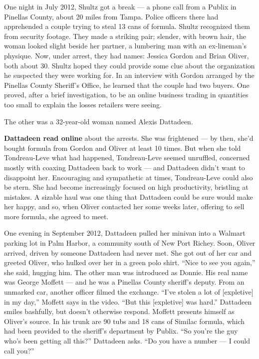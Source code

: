 One night in July 2012, Shultz got a break --- a phone call from a
Publix in Pinellas County, about 20 miles from Tampa. Police officers
there had apprehended a couple trying to steal 13 cans of formula.
Shultz recognized them from security footage. They made a striking pair;
slender, with brown hair, the woman looked slight beside her partner, a
lumbering man with an ex-lineman's physique. Now, under arrest, they had
names: Jessica Gordon and Brian Oliver, both about 30. Shultz hoped they
could provide some clue about the organization he suspected they were
working for. In an interview with Gordon arranged by the Pinellas County
Sheriff's Office, he learned that the couple had two buyers. One proved,
after a brief investigation, to be an online business trading in
quantities too small to explain the losses retailers were seeing.

The other was a 32-year-old woman named Alexis Dattadeen.

\textbf{Dattadeen read online} about the arrests. She was frightened ---
by then, she'd bought formula from Gordon and Oliver at least 10 times.
But when she told Tondreau-Leve what had happened, Tondreau-Leve seemed
unruffled, concerned mostly with coaxing Dattadeen back to work --- and
Dattadeen didn't want to disappoint her. Encouraging and sympathetic at
times, Tondreau-Leve could also be stern. She had become increasingly
focused on high productivity, bristling at mistakes. A sizable haul was
one thing that Dattadeen could be sure would make her happy, and so,
when Oliver contacted her some weeks later, offering to sell more
formula, she agreed to meet.

One evening in September 2012, Dattadeen pulled her minivan into a
Walmart parking lot in Palm Harbor, a community south of New Port
Richey. Soon, Oliver arrived, driven by someone Dattadeen had never met.
She got out of her car and greeted Oliver, who hulked over her in a
green polo shirt. ``Nice to see you again,'' she said, hugging him. The
other man was introduced as Donnie. His real name was George Moffett ---
and he was a Pinellas County sheriff's deputy. From an unmarked car,
another officer filmed the exchange. ``I've stolen a lot of
{[}expletive{]} in my day,'' Moffett says in the video. ``But this
{[}expletive{]} was hard.'' Dattadeen smiles bashfully, but doesn't
otherwise respond. Moffett presents himself as Oliver's source. In his
trunk are 90 tubs and 18 cans of Similac formula, which had been
provided to the sheriff's department by Publix. ``So you're the guy
who's been getting all this?'' Dattadeen asks. ``Do you have a number
--- I could call you?''

